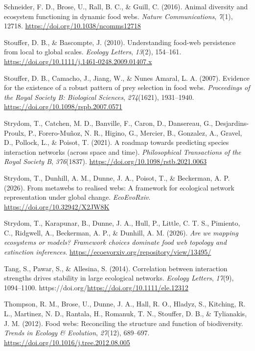 \documentclass[
]{article}
\newlength{\cslhangindent}
\newenvironment{CSLReferences}[2] %
 {\begin{list}{}{%
  \setlength{\itemindent}{0pt}
  \setlength{\leftmargin}{0pt}
  \setlength{\parsep}{0pt}
  \ifodd #1
   \setlength{\leftmargin}{\cslhangindent}
   \setlength{\itemindent}{-1\cslhangindent}
  \fi
  \setlength{\itemsep}{#2\baselineskip}}}
 {\end{list}}
\begin{document}
\begin{CSLReferences}{1}{0}
Schneider, F. D., Brose, U., Rall, B. C., \& Guill, C. (2016). Animal
diversity and ecosystem functioning in dynamic food webs. \emph{Nature
Communications}, \emph{7}(1), 12718.
\url{https://doi.org/10.1038/ncomms12718}

Stouffer, D. B., \& Bascompte, J. (2010). Understanding food-web
persistence from local to global scales. \emph{Ecology Letters},
\emph{13}(2), 154--161.
\url{https://doi.org/10.1111/j.1461-0248.2009.01407.x}

Stouffer, D. B., Camacho, J., Jiang, W., \& Nunes Amaral, L. A. (2007).
Evidence for the existence of a robust pattern of prey selection in food
webs. \emph{Proceedings of the Royal Society B: Biological Sciences},
\emph{274}(1621), 1931--1940.
\url{https://doi.org/10.1098/rspb.2007.0571}

Strydom, T., Catchen, M. D., Banville, F., Caron, D., Dansereau, G.,
Desjardins-Proulx, P., Forero-Muñoz, N. R., Higino, G., Mercier, B.,
Gonzalez, A., Gravel, D., Pollock, L., \& Poisot, T. (2021). A roadmap
towards predicting species interaction networks (across space and time).
\emph{Philosophical Transactions of the Royal Society B},
\emph{376}(1837). \url{https://doi.org/10.1098/rstb.2021.0063}

Strydom, T., Dunhill, A. M., Dunne, J. A., Poisot, T., \& Beckerman, A.
P. (2026). From metawebs to realised webs: A framework for ecological
network representation under global change. \emph{EcoEvoRxiv}.
\url{https://doi.org/10.32942/X2JW8K}

Strydom, T., Karapunar, B., Dunne, J. A., Hull, P., Little, C. T. S.,
Pimiento, C., Ridgwell, A., Beckerman, A. P., \& Dunhill, A. M. (2026).
\emph{Are we mapping ecosystems or models? Framework choices dominate
food web topology and extinction inferences}.
\url{https://ecoevorxiv.org/repository/view/13495/}

Tang, S., Pawar, S., \& Allesina, S. (2014). Correlation between
interaction strengths drives stability in large ecological networks.
\emph{Ecology Letters}, \emph{17}(9), 1094--1100.
https://doi.org/\url{https://doi.org/10.1111/ele.12312}

Thompson, R. M., Brose, U., Dunne, J. A., Hall, R. O., Hladyz, S.,
Kitching, R. L., Martinez, N. D., Rantala, H., Romanuk, T. N., Stouffer,
D. B., \& Tylianakis, J. M. (2012). Food webs: Reconciling the structure
and function of biodiversity. \emph{Trends in Ecology \& Evolution},
\emph{27}(12), 689--697.
\url{https://doi.org/10.1016/j.tree.2012.08.005}


\end{CSLReferences}
\end{document}
